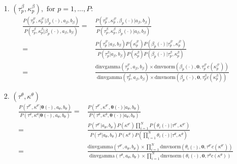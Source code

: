 \documentclass[a4paper]{article}
\begin{document}
\begin{itemize}
	\item [1.] $(\tau^\beta_p, \kappa^\beta_p), \mbox{ for } p=1,...,P$:
	\begin{equation}
	\begin{aligned}
	\frac{P(\tau^{\beta\prime}_p, \kappa^{\beta\prime}_p|\beta_p(\cdot), a_\beta, b_\beta)}{P(\tau^\beta_p, \kappa^\beta_p|\beta_p(\cdot), a_\beta, b_\beta)}=&\frac{P(\tau^{\beta\prime}_p, \kappa^{\beta\prime}_p, \beta_p(\cdot)| a_\beta, b_\beta)}{P(\tau^\beta_p, \kappa^\beta_p,\beta_p(\cdot) |a_\beta, b_\beta)}\\=&\frac{P(\tau^{\beta\prime}_p|a_\beta, b_\beta)P(\kappa^{\beta\prime}_p)P( \beta_p(\cdot)|\tau^{\beta\prime}_p, \kappa^{\beta\prime}_p) }{P(\tau^{\beta}_p|a_\beta, b_\beta)P(\kappa^{\beta}_p)P( \beta_p(\cdot)|\tau^{\beta}_p, \kappa^{\beta}_p)} \\
	=&\frac{\mbox{dinvgamma}(\tau^{\beta\prime}_p, a_\beta, b_\beta)\times\mbox{dmvnorm}( \beta_p(\cdot), \boldsymbol{0}, \tau^{\beta\prime}_pc(\kappa^{\beta\prime}_p)) }{\mbox{dinvgamma}(\tau^{\beta}_p, a_\beta, b_\beta)\times\mbox{dmvnorm}( \beta_p(\cdot), \boldsymbol{0}, \tau^{\beta}_pc(\kappa^{\beta}_p))}
	\end{aligned}
	\end{equation}
	\item [2.] $(\tau^\theta, \kappa^\theta)$
		\begin{equation}
		\begin{aligned}
		\frac{P(\tau^{\theta\prime}, \kappa^{\theta\prime}|\boldsymbol{\theta}(\cdot), a_\theta, b_\theta)}{P(\tau^\theta, \kappa^\theta|\boldsymbol{\theta}(\cdot), a_\theta, b_\theta)}=&\frac{P(\tau^{\theta\prime}, \kappa^{\theta\prime}, \boldsymbol{\theta}(\cdot)| a_\theta, b_\theta)}{P(\tau^\theta, \kappa^\theta,\boldsymbol{\theta}(\cdot)|a_\theta, b_\theta)}\\=&\frac{P(\tau^{\theta\prime}|a_\theta, b_\theta)P(\kappa^{\theta\prime})\prod_{i=1}^N P(\theta_i(\cdot)|\tau^{\theta\prime}, \kappa^{\theta\prime}) }{P(\tau^{\theta}|a_\theta, b_\theta)P(\kappa^{\theta})P( \prod_{i=1}^N\theta_i(\cdot)|\tau^{\theta}, \kappa^{\theta})}\\
			=&\frac{\mbox{dinvgamma}(\tau^{\theta\prime}, a_\theta, b_\theta)\times\prod_{i=1}^N \mbox{dmvnorm}( \theta_i(\cdot), \boldsymbol{0}, \tau^{\theta\prime}c(\kappa^{\theta\prime})) }{\mbox{dinvgamma}(\tau^{\theta}, a_\theta, b_\theta)\times\prod_{i=1}^N \mbox{dmvnorm}( \theta_i(\cdot), \boldsymbol{0}, \tau^{\theta}c(\kappa^{\theta}))}
		\end{aligned}

\end{equation}
\end{itemize}
\end{document}
